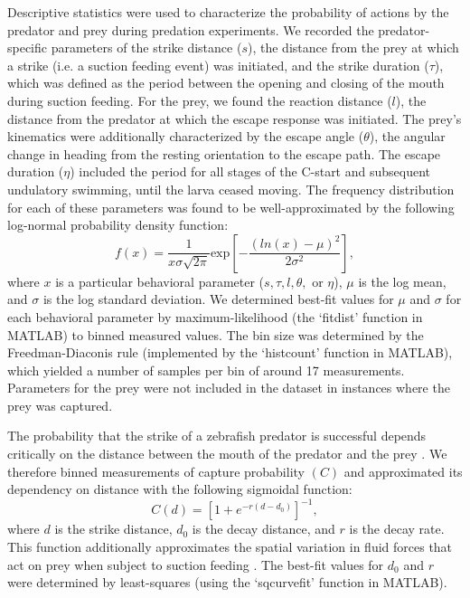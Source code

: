 \documentclass[]{rsos}%
\begin{document}
Descriptive statistics were used to characterize the probability of actions by the predator and prey during predation experiments.
We recorded the predator-specific parameters of the strike distance ($s$), the distance from the prey at which a strike (i.e. a suction feeding event) was initiated, and the strike duration ($\tau$), which was defined as the period between the opening and closing of the mouth during suction feeding. 
For the prey, we found the reaction distance ($l$), the distance from the predator at which the escape response was initiated.
The prey's kinematics were additionally characterized by the escape angle ($\theta$), the angular change in heading from the resting orientation to the escape path.
The escape duration ($\eta$) included the period for all stages of the C-start and subsequent undulatory swimming, until the larva ceased moving.
The frequency distribution for each of these parameters was found to be well-approximated by the following log-normal probability density function:
%
\begin{equation}%
f(x) = \frac{1}{x\sigma \sqrt{2 \pi}} \text{exp} \left[ -{\frac{(ln(x)-\mu)^2}{2\sigma ^2}} \right],
\label{eqn_lognorm}
\end{equation}
%
where $x$ is a particular behavioral parameter ($s, \tau, l, \theta ,$ or $\eta$), $\mu$ is the log mean, and $\sigma$ is the log standard deviation. 
We determined best-fit values for $\mu$ and $\sigma$ for each behavioral parameter by maximum-likelihood (the `fitdist' function in MATLAB) to binned measured values.
The bin size was determined by the Freedman-Diaconis rule (implemented by the `histcount' function in MATLAB), which yielded a number of samples per bin of around 17 measurements.
Parameters for the prey were not included in the dataset in instances where the prey was captured.

The probability that the strike of a zebrafish predator is successful depends critically on the distance between the mouth of the predator and the prey \cite{Stewart:2013bha}.
We therefore binned measurements of capture probability $(C)$ and approximated its dependency on distance with the following sigmoidal function:
%
\begin{equation}%
C(d) = \left[ 1+e^{-r(d-d_0)} \right]^{-1},
\label{eqn_sig} 
\end{equation}
%
where $d$ is the strike distance, $d_0$ is the decay distance, and $r$ is the decay rate. 
This function additionally approximates the spatial variation in fluid forces that act on prey when subject to suction feeding \cite{Wainwright:2007uq}.
The best-fit values for $d_0$ and $r$ were determined by least-squares (using the `sqcurvefit' function in MATLAB).
\end{document}
